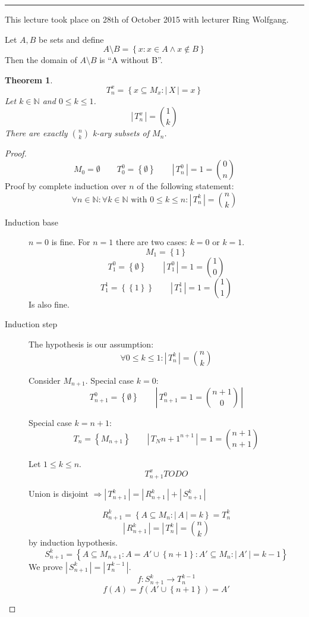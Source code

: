 \documentclass[a4paper,landscape,twocolumn]{article}
\newtheorem{theorem}{Theorem}
\newcommand\set[1]{\left\{#1\right\}}
\newcommand\card[1]{\left|\,#1\,\right|}
\newcommand\meta[3]{\hrule{} This #1 took place on #2 with lecturer #3.\par}
\begin{document}
\meta{lecture}{28th of October 2015}{Ring Wolfgang}

Let $A, B$ be sets and define
\[ A \setminus B = \set{x: x \in A \land x \not\in B} \]
Then the domain of $A \setminus B$ is \enquote{A without B}.

\begin{theorem}
  \[ T_n^x = \set{x \subseteq M_x: \card{X} = x} \]
  Let $k \in \mathbb{N}$ and $0 \leq k \leq 1$.
  \[ \card{T_n^x} = \binom{1}{k} \]
  There are exactly $\binom{n}{k}$ k-ary subsets of $M_n$.
\end{theorem}

\begin{proof}
  \[
      M_0 = \emptyset \qquad
      T_0^0 = \set{\emptyset} \qquad
      \card{T_n^0} = 1 = \binom{0}{n}
  \]
  Proof by complete induction over $n$ of the following statement:
  \[
    \forall n \in \mathbb{N}: \forall k \in \mathbb{N} \text{ with } 0 \leq k \leq n:
    \card{T_n^k} = \binom{n}{k}
  \]
  \begin{description}
    \item[Induction base]
      $n = 0$ is fine.
      For $n = 1$ there are two cases: $k = 0$ or $k = 1$.
      \[ M_1 = \set{1} \]
      \[ T_1^0 = \set{\emptyset} \qquad \card{T_1^0} = 1 = \binom{1}{0} \]
      \[ T_1^1 = \set{\set{1}} \qquad \card{T_1^1} = 1 = \binom{1}{1} \]
      Is also fine.
    \item[Induction step]
      The hypothesis is our assumption:
      \[ \forall 0 \leq k \leq 1: \card{T_n^k} = \binom{n}{k} \]

      Consider $M_{n+1}$. Special case $k = 0$:
      \[ T_{n+1}^0 = \set{\emptyset} \qquad \card{T_{n+1}^0 = 1 = \binom{n+1}{0}} \]

      Special case $k = n + 1$:
      \[ T_n^{} = \set{M_{n+1}} \qquad \card{T_N{n+1}^{n+1}} = 1 = \binom{n+1}{n+1} \]

      Let $1 \leq k \leq n$.
      \[ T_{n+1}^x TODO \]

      Union is disjoint $\Rightarrow \card{T_{n+1}^k} = \card{R_{n+1}^k} + \card{S_{n+1}^k}$

      \[ R_{n+1}^k = \set{A \subseteq M_n: \card{A} = k} = T_n^k \]
      \[ \card{R_{n+1}^k} = \card{T_n^k} = \binom{n}{k} \]
      by induction hypothesis.
      \[ S_{n+1}^k = \set{A \subseteq M_{n+1}: A = A' \cup \set{n+1}: A' \subseteq M_n: \card{A'} = k - 1} \]
      We prove $\card{S_{n+1}^k} = \card{T_n^{k-1}}$.
      \[ f: S_{n+1}^k \rightarrow T_n^{k-1} \]
      \[ f(A) = f(A' \cup \set{n+1}) = A' \]


\end{description}
\end{proof}
\end{document}
